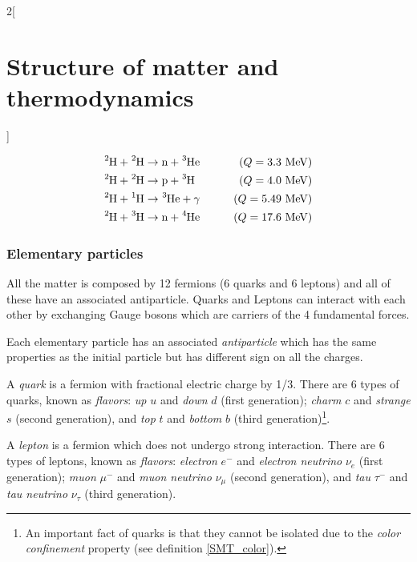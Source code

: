 \documentclass[../../../main.tex]{subfiles}
\begin{document}
\begin{multicols}{2}[\section{Structure of matter and thermodynamics}]
\begin{definition}
        \begin{align*}
            \ce{^2H}+\ce{^2H} & \rightarrow\text{n}+\ce{^3He}\qquad & (Q=3.3\text{ MeV})  \\
            \ce{^2H}+\ce{^2H} & \rightarrow\text{p}+\ce{^3H}\qquad  & (Q=4.0\text{ MeV})  \\
            \ce{^2H}+\ce{^1H} & \rightarrow\ce{^3He}+\gamma\qquad   & (Q=5.49\text{ MeV}) \\
            \ce{^2H}+\ce{^3H} & \rightarrow\text{n}+\ce{^4He}\qquad & (Q=17.6\text{ MeV})
        \end{align*}
    \end{definition}
    \subsubsection*{Elementary particles}
    \begin{definition}
        All the matter is composed by 12 fermions (6 quarks and 6 leptons) and all of these have an associated antiparticle. Quarks and Leptons can interact with each other by exchanging Gauge bosons which are carriers of the 4 fundamental forces.
    \end{definition}
    \begin{definition}[Antimatter]
        Each elementary particle has an associated \textit{antiparticle} which has the same properties as the initial particle but has different sign on all the charges.
    \end{definition}
    \begin{definition}[Quark]
        A \textit{quark} is a fermion with fractional electric charge by 1/3. There are 6 types of quarks, known as \textit{flavors}: \textit{up} $u$ and \textit{down} $d$ (first generation); \textit{charm} $c$ and \textit{strange} $s$ (second generation), and \textit{top} $t$ and \textit{bottom} $b$ (third generation)\footnote{An important fact of quarks is that they cannot be isolated due to the \textit{color confinement} property (see definition \ref{SMT_color}).}.
    \end{definition}
    \begin{definition}[Lepton]
        A \textit{lepton} is a fermion which does not undergo strong interaction. There are 6 types of leptons, known as \textit{flavors}: \textit{electron} $e^-$ and \textit{electron neutrino} $\nu_e$ (first generation); \textit{muon} $\mu^-$ and \textit{muon neutrino} $\nu_\mu$ (second generation), and \textit{tau} $\tau^-$ and \textit{tau neutrino} $\nu_\tau$ (third generation).

\end{definition}
\end{multicols}
\end{document}
